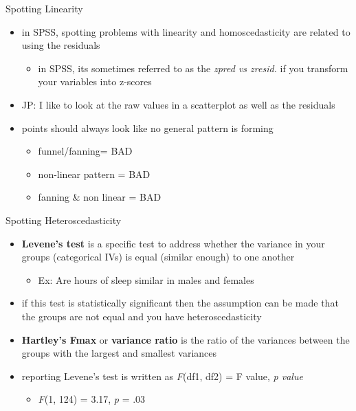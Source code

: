 \documentclass[
  ignorenonframetext,
]{beamer}
\providecommand{\tightlist}{%
  \setlength{\itemsep}{0pt}\setlength{\parskip}{0pt}}
\begin{document}
\begin{frame}{Spotting Linearity}
\protect\hypertarget{spotting-linearity}{}
\begin{itemize}
\item
  in SPSS, spotting problems with linearity and homoscedasticity are
  related to using the residuals

  \begin{itemize}
  \tightlist
  \item
    in SPSS, its sometimes referred to as the \emph{zpred vs zresid.} if
    you transform your variables into z-scores
  \end{itemize}
\item
  JP: I like to look at the raw values in a scatterplot as well as the
  residuals
\item
  points should always look like no general pattern is forming

  \begin{itemize}
  \item
    funnel/fanning= BAD
  \item
    non-linear pattern = BAD
  \item
    fanning \& non linear = BAD
  \end{itemize}
\end{itemize}
\end{frame}

\begin{frame}{Spotting Heteroscedasticity}
\protect\hypertarget{spotting-heteroscedasticity}{}
\begin{itemize}
\item
  \textbf{Levene's test} is a specific test to address whether the
  variance in your groups (categorical IVs) is equal (similar enough) to
  one another

  \begin{itemize}
  \tightlist
  \item
    Ex: Are hours of sleep similar in males and females
  \end{itemize}
\item
  if this test is statistically significant then the assumption can be
  made that the groups are not equal and you have heteroscedasticity
\item
  \textbf{Hartley's Fmax} or \textbf{variance ratio} is the ratio of the
  variances between the groups with the largest and smallest variances
\item
  reporting Levene's test is written as \emph{F}(df1, df2) = F value,
  \emph{p value}

  \begin{itemize}
  \tightlist
  \item
    \emph{F}(1, 124) = 3.17, \emph{p} = .03
  \end{itemize}
\end{itemize}
\end{frame}
\end{document}
